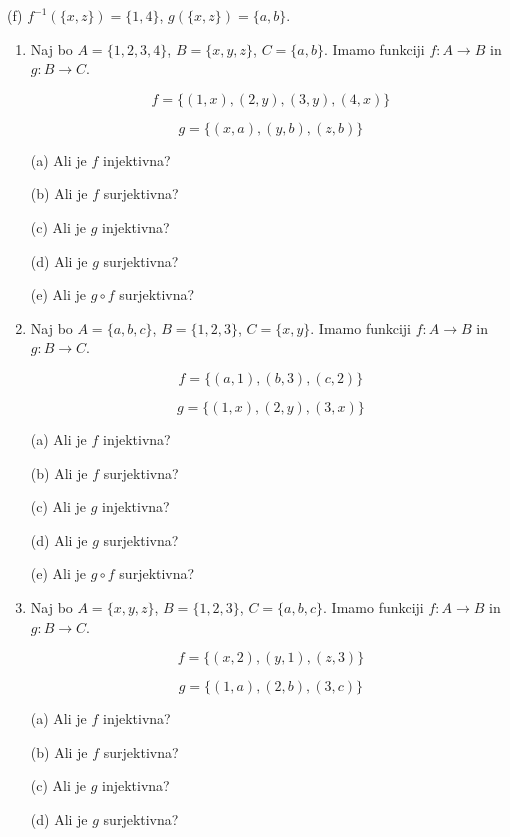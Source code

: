 \documentclass[11pt,paper=b5,footinclude,headinclude]{scrbook} %
\begin{document}
(f) $f^{-1}(\{x,z\}) = \{1,4\}$, $g(\{x,z\}) = \{a,b\}$.
%
%
%
%
\begin{enumerate}

\item Naj bo $A = \{1,2,3,4\}$, $B = \{x,y,z\}$, $C = \{a,b\}$. Imamo funkciji $f:A\to B$ in $g:B\to C$.

\[ f = \{(1,x),(2,y),(3,y),(4,x)\} \]

\[ g = \{(x,a),(y,b),(z,b)\} \]

(a) Ali je $f$ injektivna?

(b) Ali je $f$ surjektivna?

(c) Ali je $g$ injektivna?

(d) Ali je $g$ surjektivna?

(e) Ali je $g \circ f$ surjektivna?

\item Naj bo $A = \{a,b,c\}$, $B = \{1,2,3\}$, $C = \{x,y\}$. Imamo funkciji $f:A\to B$ in $g:B\to C$.

\[ f = \{(a,1),(b,3),(c,2)\} \]

\[ g = \{(1,x),(2,y),(3,x)\} \]

(a) Ali je $f$ injektivna?

(b) Ali je $f$ surjektivna?

(c) Ali je $g$ injektivna?

(d) Ali je $g$ surjektivna?

(e) Ali je $g \circ f$ surjektivna?

\item Naj bo $A = \{x,y,z\}$, $B = \{1,2,3\}$, $C = \{a,b,c\}$. Imamo funkciji $f:A\to B$ in $g:B\to C$.

\[ f = \{(x,2),(y,1),(z,3)\} \]

\[ g = \{(1,a),(2,b),(3,c)\} \]

(a) Ali je $f$ injektivna?

(b) Ali je $f$ surjektivna?

(c) Ali je $g$ injektivna?

(d) Ali je $g$ surjektivna?


\end{enumerate}
\end{document}
